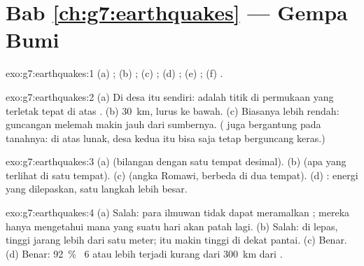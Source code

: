 \section*{Bab \ref{ch:g7:earthquakes} --- Gempa Bumi}

\begin{solution}{exo:g7:earthquakes:1}
(a) ; (b) ; (c) ; (d) ; (e) ;
(f) .
\end{solution}

\begin{solution}{exo:g7:earthquakes:2}
(a) Di desa itu sendiri:  adalah titik di permukaan yang terletak
tepat di atas . (b) \qty{30}{km}, lurus ke bawah. (c) Biasanya
lebih rendah: guncangan melemah makin jauh dari sumbernya. ( juga
bergantung pada tanahnya: di atas  lunak, desa kedua itu bisa saja
tetap berguncang keras.)
\end{solution}

\begin{solution}{exo:g7:earthquakes:3}
(a)  (bilangan dengan satu tempat desimal). (b)  (apa
yang terlihat di satu tempat). (c)  (angka Romawi, berbeda di dua
tempat). (d) : energi yang dilepaskan, satu langkah 
lebih besar.
\end{solution}

\begin{solution}{exo:g7:earthquakes:4}
(a) Salah: para ilmuwan tidak dapat meramalkan ; mereka hanya
mengetahui  mana yang suatu hari akan patah lagi. (b) Salah: di
 lepas, tinggi  jarang lebih dari satu meter;  itu
makin tinggi di dekat pantai. (c) Benar. (d) Benar: 92~\% 
~6 atau lebih terjadi kurang dari \qty{300}{km} dari .
\end{solution}

